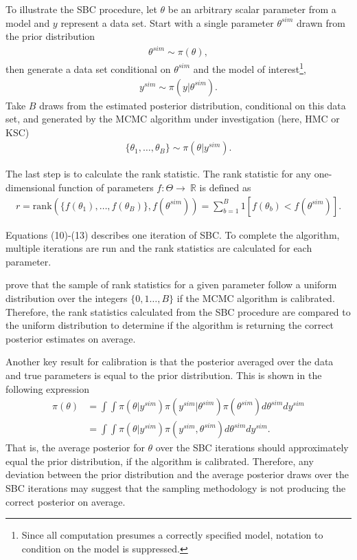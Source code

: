 \documentclass[12pt, a4paper]{article}
\begin{document}
        To illustrate the SBC procedure, let $\theta$ be an arbitrary scalar parameter from a model and $y$ represent a data set. Start with a single parameter $\theta^{sim}$ drawn from the prior distribution
        \begin{align}
        \theta^{sim} \sim \pi(\theta),
        \end{align}
        then generate a data set conditional on $\theta^{sim}$ and the model of interest\footnote{Since all computation presumes a correctly specified model, notation to condition on the model is suppressed.},
        \begin{align}
        y^{sim} \sim \pi (y|\theta^{sim}).
        \end{align}
        Take $B$ draws from the estimated posterior distribution, conditional on this data set, and generated by the MCMC algorithm under investigation (here, HMC or KSC)
        \begin{align}
        \{\theta_1,\dots , \theta_{B}\} \sim \pi (\theta | y^{sim}).
        \end{align}

        The last step is to calculate the rank statistic. The rank statistic for any one-dimensional function of parameters $f:\Theta\rightarrow\ \mathbb{R}$ is defined as
        \begin{align}
        r = \mathrm{rank}(\{f(\theta_1),\dots , f(\theta_{B})\}, f(\theta^{sim})) = \sum_{b=1}^{B}1[f(\theta_{b}) < f(\theta^{sim})].
        \end{align}

        Equations (10)-(13) describes one iteration of SBC. To complete the algorithm, multiple iterations are run and the rank statistics are calculated for each parameter. 
        
        \citet{talts2020validating} prove that the sample of rank statistics for a given parameter follow a uniform distribution over the integers $\{0,1\dots,B\}$ if the MCMC algorithm is calibrated. Therefore, the rank statistics calculated from the SBC procedure are compared to the uniform distribution to determine if the algorithm is returning the correct posterior estimates on average.

        Another key result for calibration is that the posterior averaged over the data and true parameters is equal to the prior distribution. This is shown in the following expression
        \begin{align}
        \pi(\theta) &= \int \int \pi(\theta|y^{sim}) \pi(y^{sim}|\theta^{sim}) \pi(\theta^{sim})d\theta^{sim} dy^{sim} \\
        &= \int \int \pi(\theta|y^{sim}) \pi(y^{sim},\theta^{sim}) d\theta^{sim} dy^{sim}.
        \end{align}
        That is, the average posterior for $\theta$ over the SBC iterations should approximately equal the prior distribution, if the algorithm is calibrated. Therefore, any deviation between the prior distribution and the average posterior draws over the SBC iterations may suggest that the sampling methodology is not producing the correct posterior on average.
\end{document}

